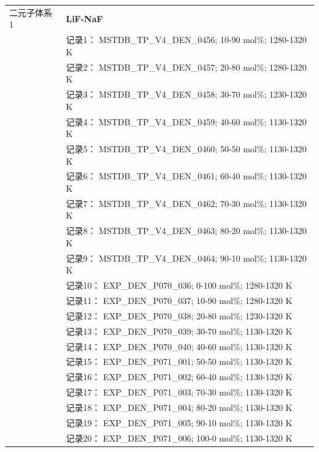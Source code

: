 \documentclass[12pt]{article}
\begin{document}
{\begin{longtable}[]{@{}
  >{\raggedright\arraybackslash}p{}
  >{\raggedright\arraybackslash}p{}@{}}
二元子体系 1  & \textbf{LiF-NaF} \\
 & 记录1： MSTDB\_TP\_V4\_DEN\_0456; 10-90 mol\%; 1280-1320 K \\
 & 记录2： MSTDB\_TP\_V4\_DEN\_0457; 20-80 mol\%; 1280-1320 K \\
 & 记录3： MSTDB\_TP\_V4\_DEN\_0458; 30-70 mol\%; 1230-1320 K \\
 & 记录4： MSTDB\_TP\_V4\_DEN\_0459; 40-60 mol\%; 1130-1320 K \\
 & 记录5： MSTDB\_TP\_V4\_DEN\_0460; 50-50 mol\%; 1130-1320 K \\
 & 记录6： MSTDB\_TP\_V4\_DEN\_0461; 60-40 mol\%; 1130-1320 K \\
 & 记录7： MSTDB\_TP\_V4\_DEN\_0462; 70-30 mol\%; 1130-1320 K \\
 & 记录8： MSTDB\_TP\_V4\_DEN\_0463; 80-20 mol\%; 1130-1320 K \\
 & 记录9： MSTDB\_TP\_V4\_DEN\_0464; 90-10 mol\%; 1130-1320 K \\
 & 记录10： EXP\_DEN\_P070\_036; 0-100 mol\%; 1280-1320 K \\
 & 记录11： EXP\_DEN\_P070\_037; 10-90 mol\%; 1280-1320 K \\
 & 记录12： EXP\_DEN\_P070\_038; 20-80 mol\%; 1230-1320 K \\
 & 记录13： EXP\_DEN\_P070\_039; 30-70 mol\%; 1130-1320 K \\
 & 记录14： EXP\_DEN\_P070\_040; 40-60 mol\%; 1130-1320 K \\
 & 记录15： EXP\_DEN\_P071\_001; 50-50 mol\%; 1130-1320 K \\
 & 记录16： EXP\_DEN\_P071\_002; 60-40 mol\%; 1130-1320 K \\
 & 记录17： EXP\_DEN\_P071\_003; 70-30 mol\%; 1130-1320 K \\
 & 记录18： EXP\_DEN\_P071\_004; 80-20 mol\%; 1130-1320 K \\
 & 记录19： EXP\_DEN\_P071\_005; 90-10 mol\%; 1130-1320 K \\
 & 记录20： EXP\_DEN\_P071\_006; 100-0 mol\%; 1130-1320 K  \\


\end{longtable}}
\end{document}
